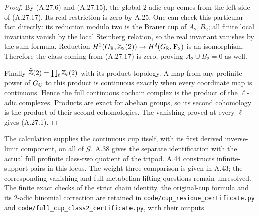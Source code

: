 \begin{proof}
By (A.27.6) and (A.27.15), the global $2$-adic cup comes
from the left side of (A.27.17). Its real restriction is
zero by A.25. One can check this particular fact directly:
its reduction modulo two is the Brauer cup of $A_2,B_2$;
all finite local invariants vanish by the local Steinberg
relation, so the real invariant vanishes by the sum formula.
Reduction
$H^2(G_\mathbb R,\mathbb Z_2(2))\to H^2(G_\mathbb R,\mathbf F_2)$ is an
isomorphism. Therefore the class coming from (A.27.17)
is zero, proving $A_2\cup B_2=0$ as well.

Finally $\widehat{\mathbb Z}(2)=\prod_\ell\mathbb Z_\ell(2)$ with its
product topology. A map from any profinite power of $G_\mathbb Q$
to this product is continuous exactly when every
coordinate map is continuous. Hence the full continuous
cochain complex is the product of the $\ell$-adic complexes.
Products are exact for abelian groups, so its second
cohomology is the product of their second cohomologies.
The vanishing proved at every $\ell$ gives (A.27.1).
\end{proof}

The calculation supplies the continuous cup itself, with
its first derived inverse-limit component, on all of
$\mathcal G$. A.38 gives the separate identification with
the actual full profinite class-two quotient of the tripod.
A.44 constructs infinite-support pairs in this locus. The
weight-three comparison is given in A.43; the corresponding
vanishing and full metabelian lifting questions remain unresolved. The finite exact checks of the
strict chain identity, the original-cup formula and its
$2$-adic binomial correction are retained in
\texttt{code/cup\_residue\_certificate.py} and
\texttt{code/full\_cup\_class2\_certificate.py}, with their outputs.
